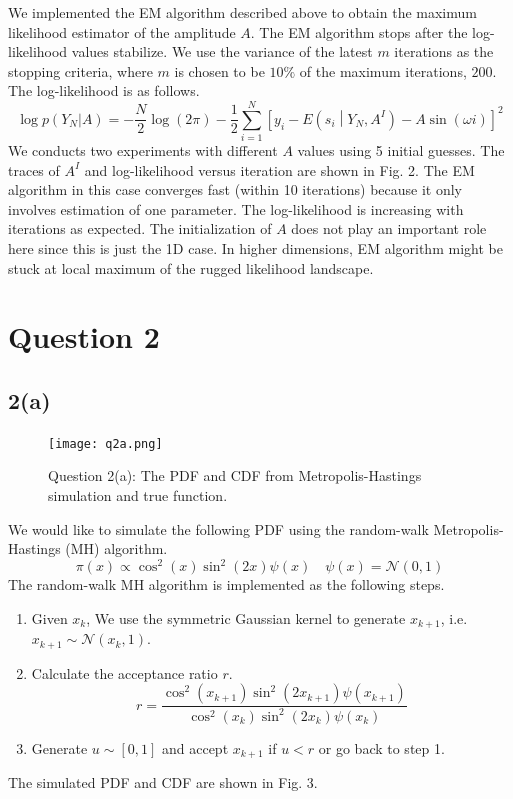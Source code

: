 \documentclass[a4paper, 11pt]{article}
\begin{document}
We implemented the EM algorithm described above to obtain the maximum likelihood estimator of the amplitude $A$. The EM algorithm stops after the log-likelihood values stabilize. We use the variance of the latest $m$ iterations as the stopping criteria, where $m$ is chosen to be $10\%$ of the maximum iterations, $200$. The log-likelihood is as follows. 
\begin{equation}
\log p(Y_N|A) = -\frac{N}{2}\log(2\pi) - \frac{1}{2}\sum_{i=1}^N \left[y_i - E\left(s_i\middle| Y_N, A^I \right) - A\sin(\omega i) \right]^2
\end{equation}
We conducts two experiments with different $A$ values using 5 initial guesses. The traces of $A^I$ and log-likelihood versus iteration are shown in Fig. 2. The EM algorithm in this case converges fast (within 10 iterations) because it only involves estimation of one parameter. The log-likelihood is increasing with iterations as expected. The initialization of $A$ does not play an important role here since this is just the 1D case. In higher dimensions, EM algorithm might be stuck at local maximum of the rugged likelihood landscape. 



\section*{Question 2}
\subsection*{2(a)}


\begin{figure}
	\begin{center}
		\texttt{[image: q2a.png]}
		\caption{Question 2(a): The PDF and CDF from Metropolis-Hastings simulation and true function. }
	\end{center}
\end{figure}

We would like to simulate the following PDF using the random-walk Metropolis-Hastings (MH) algorithm. 
\begin{equation}
\pi(x) \propto \cos^2(x)\sin^2(2x)\psi(x) \quad \psi(x) = \mathcal{N}(0,1)
\end{equation}
The random-walk MH algorithm is implemented as the following steps. 
\begin{enumerate}
\item Given $x_k$, We use the symmetric Gaussian kernel to generate $x_{k+1}$, i.e. $x_{k+1}\sim\mathcal{N}(x_k, 1)$. 
\item Calculate the acceptance ratio $r$. 
\begin{equation}
r = \frac{\cos^2(x_{k+1})\sin^2(2x_{k+1})\psi(x_{k+1})}{\cos^2(x_k)\sin^2(2x_k)\psi(x_k)}
\end{equation}
\item Generate $u\sim [0,1]$ and accept $x_{k+1}$ if $u < r$ or go back to step 1. 
\end{enumerate}
The simulated PDF and CDF are shown in Fig. 3. 
\end{document}
